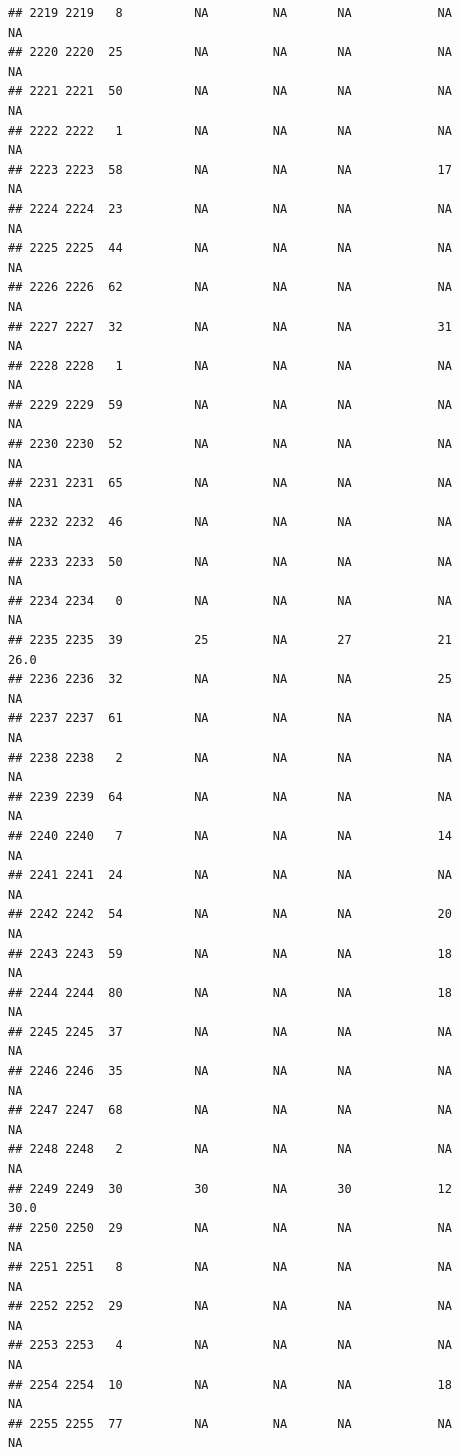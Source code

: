 \documentclass[man]{apa6}
\begin{document}
\begin{verbatim}
## 2219 2219   8          NA         NA       NA            NA       NA
## 2220 2220  25          NA         NA       NA            NA       NA
## 2221 2221  50          NA         NA       NA            NA       NA
## 2222 2222   1          NA         NA       NA            NA       NA
## 2223 2223  58          NA         NA       NA            17       NA
## 2224 2224  23          NA         NA       NA            NA       NA
## 2225 2225  44          NA         NA       NA            NA       NA
## 2226 2226  62          NA         NA       NA            NA       NA
## 2227 2227  32          NA         NA       NA            31       NA
## 2228 2228   1          NA         NA       NA            NA       NA
## 2229 2229  59          NA         NA       NA            NA       NA
## 2230 2230  52          NA         NA       NA            NA       NA
## 2231 2231  65          NA         NA       NA            NA       NA
## 2232 2232  46          NA         NA       NA            NA       NA
## 2233 2233  50          NA         NA       NA            NA       NA
## 2234 2234   0          NA         NA       NA            NA       NA
## 2235 2235  39          25         NA       27            21     26.0
## 2236 2236  32          NA         NA       NA            25       NA
## 2237 2237  61          NA         NA       NA            NA       NA
## 2238 2238   2          NA         NA       NA            NA       NA
## 2239 2239  64          NA         NA       NA            NA       NA
## 2240 2240   7          NA         NA       NA            14       NA
## 2241 2241  24          NA         NA       NA            NA       NA
## 2242 2242  54          NA         NA       NA            20       NA
## 2243 2243  59          NA         NA       NA            18       NA
## 2244 2244  80          NA         NA       NA            18       NA
## 2245 2245  37          NA         NA       NA            NA       NA
## 2246 2246  35          NA         NA       NA            NA       NA
## 2247 2247  68          NA         NA       NA            NA       NA
## 2248 2248   2          NA         NA       NA            NA       NA
## 2249 2249  30          30         NA       30            12     30.0
## 2250 2250  29          NA         NA       NA            NA       NA
## 2251 2251   8          NA         NA       NA            NA       NA
## 2252 2252  29          NA         NA       NA            NA       NA
## 2253 2253   4          NA         NA       NA            NA       NA
## 2254 2254  10          NA         NA       NA            18       NA
## 2255 2255  77          NA         NA       NA            NA       NA

\end{verbatim}
\end{document}
